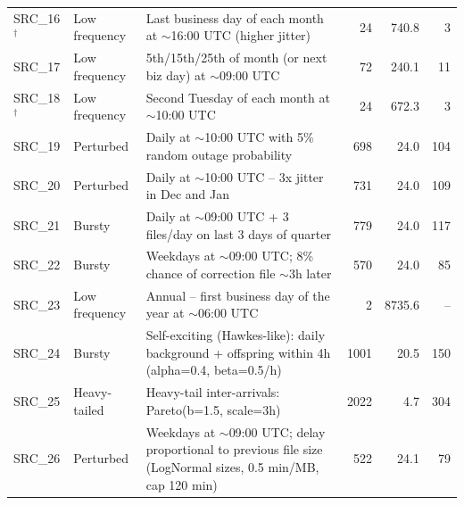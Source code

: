 \begin{table}[t]
\begin{tabular}{llp{9.2cm}rrr}
SRC\_16$^\dagger$ & Low frequency & Last business day of each month at $\sim$16:00 UTC (higher jitter) & 24 & 740.8 & 3 \\
SRC\_17 & Low frequency & 5th/15th/25th of month (or next biz day) at $\sim$09:00 UTC & 72 & 240.1 & 11 \\
SRC\_18$^\dagger$ & Low frequency & Second Tuesday of each month at $\sim$10:00 UTC & 24 & 672.3 & 3 \\
SRC\_19 & Perturbed & Daily at $\sim$10:00 UTC with 5\% random outage probability & 698 & 24.0 & 104 \\
SRC\_20 & Perturbed & Daily at $\sim$10:00 UTC -- 3x jitter in Dec and Jan & 731 & 24.0 & 109 \\
SRC\_21 & Bursty & Daily at $\sim$09:00 UTC + 3 files/day on last 3 days of quarter & 779 & 24.0 & 117 \\
SRC\_22 & Bursty & Weekdays at $\sim$09:00 UTC; 8\% chance of correction file $\sim$3h later & 570 & 24.0 & 85 \\
SRC\_23 & Low frequency & Annual -- first business day of the year at $\sim$06:00 UTC & 2 & 8735.6 & -- \\
SRC\_24 & Bursty & Self-exciting (Hawkes-like): daily background + offspring within 4h (alpha=0.4, beta=0.5/h) & 1001 & 20.5 & 150 \\
SRC\_25 & Heavy-tailed & Heavy-tail inter-arrivals: Pareto(b=1.5, scale=3h) & 2022 & 4.7 & 304 \\
SRC\_26 & Perturbed & Weekdays at $\sim$09:00 UTC; delay proportional to previous file size (LogNormal sizes, 0.5 min/MB, cap 120 min) & 522 & 24.1 & 79 \\
\bottomrule
\end{tabular}
\end{table}
